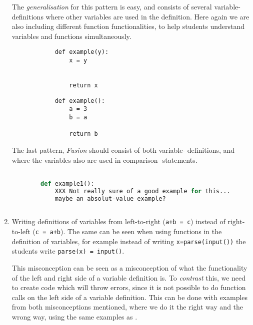 \begin{enumerate}
      The \emph{generalisation} for this pattern is easy, and consists of 
several variable-definitions where other variables are used in the 
definition. Here again we are also including different function 
functionalities, to help students understand variables and functions 
simultaneously. 

      \hfill
     \begin{minipage}[t]{0.45\columnwidth}
        \begin{verbatim}
            def example(y):
                x = y

    
                return x   
        \end{verbatim}
    \end{minipage}
\hfill
    \begin{minipage}[t]{0.45\columnwidth}
        \begin{verbatim}
            def example():
                a = 3
                b = a
    
                return b
        \end{verbatim}
    \end{minipage}
\hfill
     
      
      The last pattern, \emph{Fusion} should consist of both variable-
definitions, and where the variables also are used in comparison-
statements. 

      \begin{lstlisting}[language=Python]

        def example1():
            XXX Not really sure of a good example for this... 
            maybe an absolut-value example?
                
    \end{lstlisting}
    \item Writing definitions of variables from left-to-right 
      (\texttt{a+b = c}) instead of right-to-left 
      (\texttt{c = a+b}). The same can be seen when using 
functions 
      in the definition of variables, for example instead of writing 
      \texttt{x=parse(input())} the students write 
      \texttt{parse(x) = input()}.

      This misconception can be seen as a misconception of what the 
functionality of the left and right side of a variable definition 
is. To \emph{contrast} this, we need to create code which will throw 
errors, since it is not possible to do function calls on the left 
side of a variable definition. This can be done with examples from 
both misconceptions mentioned, where we do it the right way and the 
wrong way, using the same examples as \textcite{GuoMarkelZhang2020}.


\end{enumerate}
